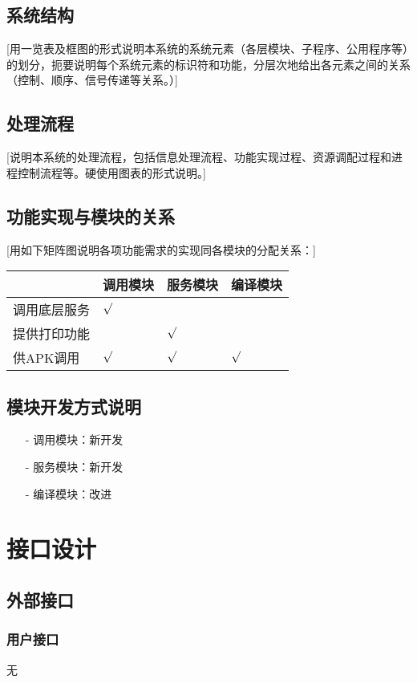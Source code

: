 \documentclass[10pt,a4paper,titlepage]{article} %
\begin{document}
\subsection{系统结构}
[用一览表及框图的形式说明本系统的系统元素（各层模块、子程序、公用程序等）的划分，扼要说明每个系统元素的标识符和功能，分层次地给出各元素之间的关系（控制、顺序、信号传递等关系。）]\newline
\subsection{处理流程}
[说明本系统的处理流程，包括信息处理流程、功能实现过程、资源调配过程和进程控制流程等。硬使用图表的形式说明。] \newline
\subsection{功能实现与模块的关系}
[用如下矩阵图说明各项功能需求的实现同各模块的分配关系：]
\begin{center}  
\begin{tabular}{|m{3cm}<{\centering}|m{3cm}<{\centering}|m{3cm}<{\centering}|m{3cm}<{\centering}|}
\hline  
           & 调用模块  & 服务模块 & 编译模块  \\ \hline  
 调用底层服务 & $\surd$ &         &     \\ \hline
 提供打印功能 &         & $\surd$ &     \\ \hline
 供APK调用 & $\surd$ & $\surd$ &  $\surd$  \\ \hline
\end{tabular}  
\end{center}  

\subsection{模块开发方式说明}
\begin{itemize}
  \item[-] 调用模块：新开发
  \item[-] 服务模块：新开发
  \item[-] 编译模块：改进
\end{itemize}
\section{接口设计}
\subsection{外部接口}
\subsubsection{用户接口}
无
\end{document}

